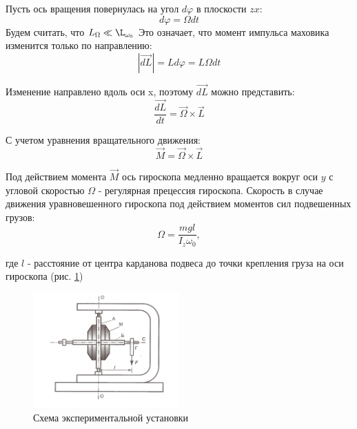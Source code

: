     Пусть ось вращения повернулась на угол $d\varphi$ в плоскости $zx$:
    \[d\varphi=\Omega dt\]
    Будем считать, что $L_\Omega \ll \L_{\omega_0}$ 
    Это означает, что момент импульса маховика изменится только по направлению:
    \begin{equation}
        \left|\overrightarrow{dL}\right|=Ld\varphi=L\Omega dt
    \end{equation} 
    
    Изменение направлено вдоль оси x, поэтому $\overrightarrow{dL}$ можно представить:
    \begin{equation}
        \frac{\overrightarrow{dL}}{dt}=\overrightarrow{\Omega}\times\overrightarrow{L}
    \end{equation}
    
    С учетом уравнения вращательного движения:
    \begin{equation}
        \overrightarrow{M}=\overrightarrow{\Omega}\times\overrightarrow{L}
    \end{equation}
        
    Под действием момента $\overrightarrow{M}$ ось гироскопа медленно вращается вокруг оси $y$ с угловой скоростью $\Omega$ - регулярная прецессия гироскопа.
    Скорость в случае движения уравновешенного гироскопа под действием моментов сил подвешенных грузов:
    \begin{equation}
        \label{связь омег}
        \Omega = \frac{mgl}{I_z\omega_0},
    \end{equation}
    
    где $l$ - расстояние от центра карданова подвеса до точки крепления груза на оси гироскопа (рис. \ref{схема})
    \begin{figure}[h!]
        \begin{center}
        \includegraphics[width=0.5\textwidth]{./images/2.png}
        \end{center}
        \caption{Схема экспериментальной установки} \label{схема}
    \end{figure}
    
